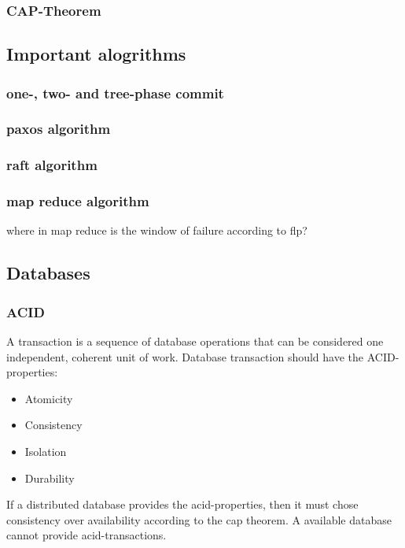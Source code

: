 \subsubsection{CAP-Theorem}


\subsection{Important alogrithms}

\subsubsection{one-, two- and tree-phase commit}

\subsubsection{paxos algorithm}

\subsubsection{raft algorithm}

\subsubsection{map reduce algorithm}
where in map reduce is the window of failure according to flp?


\subsection{Databases}

\subsubsection{ACID}
A transaction is a sequence of database operations that can be considered one independent, coherent unit of work. Database transaction should have the ACID-properties:
\begin{itemize}
    \item Atomicity
    \item Consistency
    \item Isolation
    \item Durability
\end{itemize}

If a distributed database provides the acid-properties, then it must chose consistency over availability according to the cap theorem. A available database cannot provide acid-transactions. 


